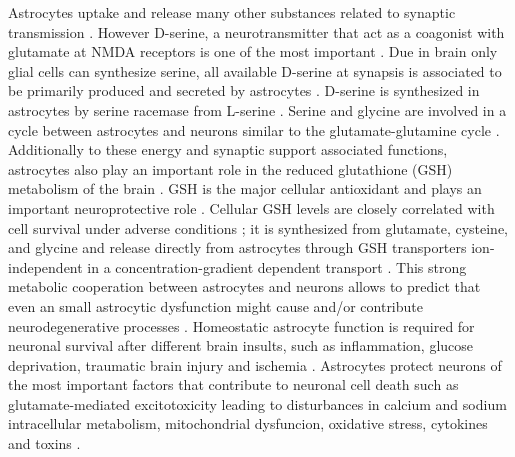 Astrocytes uptake and release many other substances related to synaptic transmission \cite{Petrelli2016}. However D-serine, a neurotransmitter that act as a coagonist with glutamate at NMDA receptors is one of the most important \cite{Halassa2010}. Due in brain only glial cells can synthesize serine, all available D-serine at synapsis is associated to be primarily produced and secreted by astrocytes \cite{Barres2008}. D-serine is synthesized in astrocytes by serine racemase from L-serine \cite{Durrant2014}. Serine and glycine are involved in a cycle between astrocytes and neurons similar to the glutamate-glutamine cycle \cite{Cakir2007}. Additionally to these energy and synaptic support associated functions, astrocytes also play an important role in the reduced glutathione (GSH) metabolism of the brain \cite{Raps1989}. GSH is the major cellular antioxidant and plays an important neuroprotective role \cite{Jha2016}. Cellular GSH levels are closely correlated with cell survival under adverse conditions \cite{Allaman2011}; it is synthesized from glutamate, cysteine, and glycine and release directly from astrocytes through GSH transporters ion-independent in a concentration-gradient dependent transport \cite{Wang2000}. 
This strong metabolic cooperation between astrocytes and neurons allows to predict that even an small astrocytic dysfunction might cause and/or contribute neurodegenerative processes \cite{Maragakis2006}. Homeostatic astrocyte function is required for neuronal survival after different brain insults, such as inflammation, glucose deprivation, traumatic brain injury and ischemia \cite{Avila-Rodriguez2014,Jha2016}. Astrocytes protect neurons of the most important factors that contribute to neuronal cell death such as glutamate-mediated excitotoxicity leading to disturbances in calcium and sodium intracellular metabolism, mitochondrial dysfuncion, oxidative stress, cytokines and toxins \cite{Takuma2004,Lange2012,Nijboer2013,Hussain2013}.

